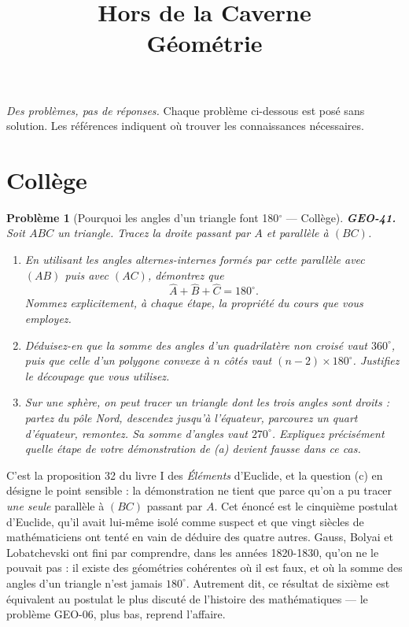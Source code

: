 \documentclass[11pt]{article}
\title{Hors de la Caverne \\ \Large Géométrie}
\author{}
\date{}
\newtheorem{problem}{Problème}
\begin{document}
\maketitle
\noindent\emph{Des problèmes, pas de réponses.} Chaque problème ci-dessous est posé
sans solution. Les références indiquent où trouver les connaissances nécessaires.
\medskip


\section*{Collège}

\begin{problem}[{Pourquoi les angles d'un triangle font 180$^\circ$ --- Collège}]
\textbf{GEO-41.} Soit $ ABC $ un triangle. Tracez la droite passant par $ A $ et parallèle à
$ (BC) $.
\begin{enumerate}
\item[(a)] En utilisant les angles alternes-internes formés par cette parallèle avec $ (AB) $ puis avec
$ (AC) $, démontrez que
\[ \widehat{A} + \widehat{B} + \widehat{C} = 180^\circ . \]
Nommez explicitement, à chaque étape, la propriété du cours que vous employez.
\item[(b)] Déduisez-en que la somme des angles d'un quadrilatère non croisé vaut $ 360^\circ $, puis que
celle d'un polygone convexe à $ n $ côtés vaut $ (n-2) \times 180^\circ $. Justifiez le découpage
que vous utilisez.
\item[(c)] Sur une sphère, on peut tracer un triangle dont les trois angles sont droits : partez du pôle
Nord, descendez jusqu'à l'équateur, parcourez un quart d'équateur, remontez. Sa somme d'angles vaut
$ 270^\circ $. Expliquez précisément quelle étape de votre démonstration de (a) devient fausse dans
ce cas.
\end{enumerate}

\end{problem}

\noindent C'est la proposition 32 du livre I des \textit{Éléments} d'Euclide, et la question (c)
en désigne le point sensible : la démonstration ne tient que parce qu'on a pu tracer \textit{une seule}
parallèle à $ (BC) $ passant par $ A $. Cet énoncé est le cinquième postulat d'Euclide, qu'il
avait lui-même isolé comme suspect et que vingt siècles de mathématiciens ont tenté en vain de
déduire des quatre autres. Gauss, Bolyai et Lobatchevski ont fini par comprendre, dans les années
1820-1830, qu'on ne le pouvait pas : il existe des géométries cohérentes où il est faux, et où la
somme des angles d'un triangle n'est jamais $ 180^\circ $. Autrement dit, ce résultat de sixième est
équivalent au postulat le plus discuté de l'histoire des mathématiques --- le problème GEO-06, plus bas,
reprend l'affaire.
\end{document}

